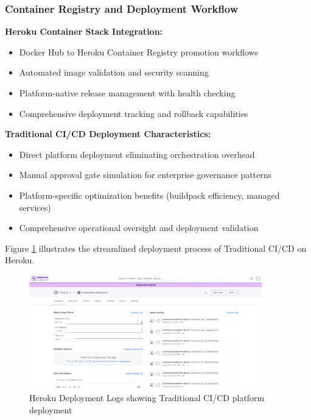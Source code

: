 \subsubsection{Container Registry and Deployment Workflow}

\textbf{Heroku Container Stack Integration:}
\begin{itemize}
\item Docker Hub to Heroku Container Registry promotion workflows
\item Automated image validation and security scanning
\item Platform-native release management with health checking
\item Comprehensive deployment tracking and rollback capabilities
\end{itemize}

\textbf{Traditional CI/CD Deployment Characteristics:}
\begin{itemize}
\item Direct platform deployment eliminating orchestration overhead
\item Manual approval gate simulation for enterprise governance patterns
\item Platform-specific optimization benefits (buildpack efficiency, managed services)
\item Comprehensive operational oversight and deployment validation
\end{itemize}

Figure \ref{fig:heroku-deployment-logs} illustrates the streamlined deployment process of Traditional CI/CD on Heroku.

\begin{figure}[H]
\centering
\includegraphics[width=0.9\textwidth]{figures/chapter5/heroku-deployment-logs.png}
\caption{Heroku Deployment Logs showing Traditional CI/CD platform deployment}
\label{fig:heroku-deployment-logs}
\end{figure}


